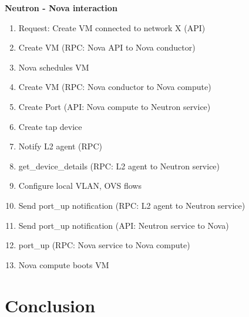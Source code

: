\textbf{Neutron - Nova interaction}

\begin{enumerate}
\item Request: Create VM connected to network X (API)
\item Create VM (RPC: Nova API to Nova conductor)
\item Nova schedules VM
\item Create VM (RPC: Nova conductor to Nova compute)
\item Create Port (API: Nova compute to Neutron service)
\item Create tap device
\item Notify L2 agent (RPC)
\item get\_device\_details (RPC: L2 agent to Neutron service)
\item Configure local VLAN, OVS flows
\item Send port\_up notification (RPC: L2 agent to Neutron service)
\item Send port\_up notification (API: Neutron service to Nova)
\item port\_up (RPC: Nova service to Nova compute)
\item Nova compute boots VM

\end{enumerate}


\section{Conclusion}